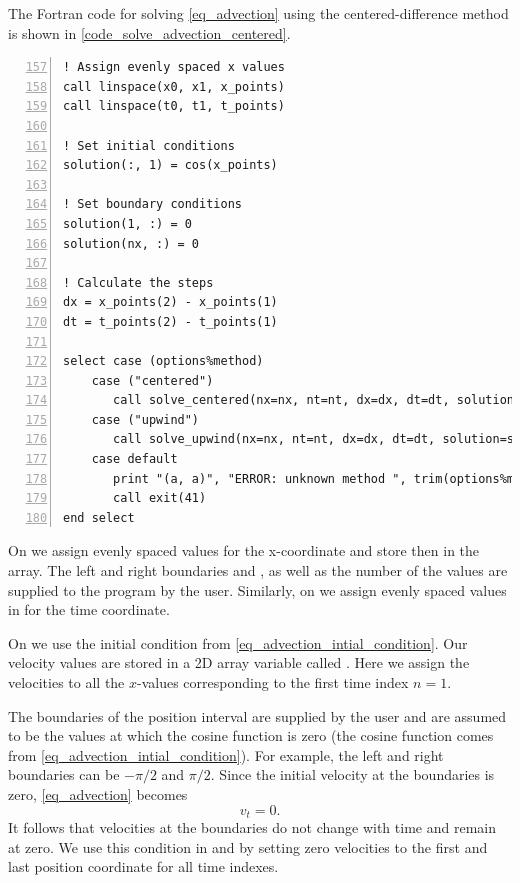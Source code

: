 The Fortran code for solving \autoref{eq_advection} using the centered-difference method is shown in \autoref{code_solve_advection_centered}.


\noindent\begin{minipage}{\linewidth}
\begin{lstlisting}[caption={Solving advection equation (\code{advection\_equation.f90}).},frame=tlrb,label={code_solve_advection_centered}, numbers=left, firstnumber=157]
! Assign evenly spaced x values
call linspace(x0, x1, x_points)
call linspace(t0, t1, t_points)

! Set initial conditions
solution(:, 1) = cos(x_points)

! Set boundary conditions
solution(1, :) = 0
solution(nx, :) = 0

! Calculate the steps
dx = x_points(2) - x_points(1)
dt = t_points(2) - t_points(1)

select case (options%method)
    case ("centered")
       call solve_centered(nx=nx, nt=nt, dx=dx, dt=dt, solution=solution)
    case ("upwind")
       call solve_upwind(nx=nx, nt=nt, dx=dx, dt=dt, solution=solution)
    case default
       print "(a, a)", "ERROR: unknown method ", trim(options%method)
       call exit(41)
end select
\end{lstlisting}
\end{minipage}

On  we assign evenly spaced values for the x-coordinate and store then in the  array. The left and right boundaries  and , as well as the number of the values  are supplied to the program by the user. Similarly, on  we assign evenly spaced values in  for the time coordinate.

On  we use the initial condition from \autoref{eq_advection_intial_condition}. Our velocity values are stored in a 2D array variable called . Here we assign the velocities to all the $x$-values corresponding to the first time index $n=1$.

The boundaries of the position interval are supplied by the user and are assumed to be the values at which the cosine function is zero (the cosine function comes from \autoref{eq_advection_intial_condition}). For example, the left and right boundaries can be $-\pi/2$ and $\pi/2$. Since the initial velocity at the boundaries is zero, \autoref{eq_advection} becomes
\[
  v_t = 0.
\]
It follows that velocities at the boundaries do not change with time and remain at zero. We use this condition in  and  by setting zero velocities to the first and last position coordinate for all time indexes.

